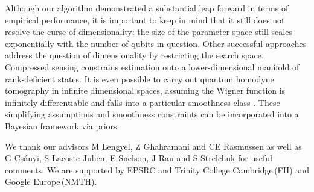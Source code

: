 \documentclass[aps,twocolumn,prl]{revtex4-1}
\begin{document}
Although our algorithm demonstrated a substantial leap forward in terms of empirical performance, it is important to keep in mind that it still does not resolve the curse of dimensionality: the size of the parameter space still scales exponentially with the number of qubits in question. Other successful approaches address the question of dimensionality by restricting the search space. Compressed sensing \cite{CompressedSensing} constrains estimation onto a lower-dimensional manifold of rank-deficient states. It is even possible to carry out quantum homodyne tomography in infinite dimensional spaces, assuming the Wigner function is infinitely differentiable and falls into a particular smoothness class \cite{Butucea2007}. These simplifying assumptions and smoothness constraints can be incorporated into a Bayesian framework via priors.

\begin{acknowledgments}
We thank our advisors M Lengyel, Z Ghahramani and CE Rasmussen as well as G Cs\'{a}nyi, S Lacoste-Julien, E Snelson, J Rau and S Strelchuk for useful comments. We are supported by EPSRC and Trinity College Cambridge\,(FH) and Google Europe\,(NMTH).
\end{acknowledgments}


\end{document}
